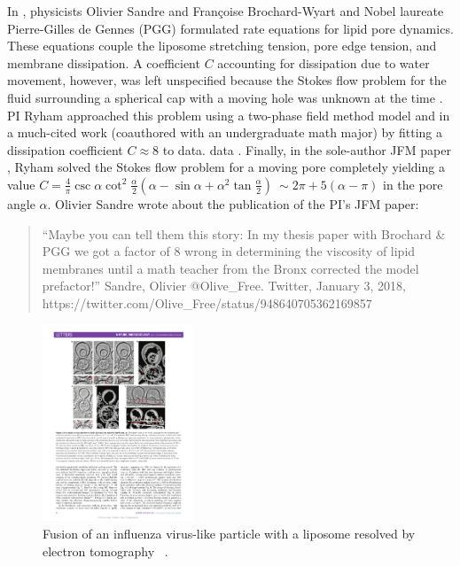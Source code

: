 In \cite{BrdGSa00}, 
physicists Olivier Sandre and Fran\c{c}oise Brochard-Wyart
and Nobel laureate Pierre-Gilles de Gennes
(PGG) formulated
rate equations for lipid pore dynamics.  These equations couple
the liposome stretching tension, pore edge tension, and membrane
dissipation.  A coefficient $C$ accounting for dissipation due to water
movement, however, was left unspecified because the Stokes flow
problem for the fluid surrounding a spherical cap with a moving hole
was unknown at the time \cite{Ra73}.  PI Ryham approached this problem using
a two-phase field method model \cite{RyCoEi12} and in a much-cited work
(coauthored with an undergraduate math major) by
fitting a dissipation coefficient $C \approx 8$ to data.
data \cite{RYHAM20112929}.  Finally, in the sole-author 
JFM paper \cite{Ryham2017OnTV},
Ryham solved the Stokes flow problem for
a moving pore completely yielding a value 
$C = \frac{4}{\pi}\csc \alpha\cot^2\frac{\alpha}{2}(\alpha - \sin \alpha + \alpha^2 \tan \frac{\alpha}{2})
~\sim 2\pi + 5(\alpha - \pi)$ in the pore angle $\alpha$.
Olivier Sandre wrote about the publication of the PI’s JFM paper:

\begin{quotation}“Maybe you can tell them this story: In my thesis
paper with Brochard \& PGG we got a factor of 8 wrong in determining
the viscosity of lipid membranes until a math teacher from the
Bronx corrected the model prefactor!”  Sandre, Olivier @Olive\_Free.
Twitter, January 3, 2018, https://twitter.com/Olive\_Free/status/948640705362169857
\end{quotation}

\begin{figure}
  \vspace{-5pt}
\centerline{\includegraphics[width=0.4\textwidth]{figures/SA1Figures/FusionMicroscopy.pdf}}
  \vspace{-5pt}
\caption{\label{fig:FusionMicroscopy}
Fusion of an influenza virus-like particle with a liposome resolved
by electron tomography
~\cite{Chetal16}.}
\end{figure}


